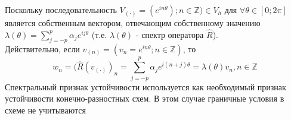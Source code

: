 \documentclass[__main__.tex]{subfiles}
\begin{document}
Поскольку последовательность $V_{(\cdot)} = (e^{in\theta}); n \in \mathbb{Z}) \in V_h$ для $\forall \theta \in [0;2\pi]$ \\
является собственным вектором, отвечающим собственному значению $\lambda(\theta) = \sum_{j=-p}^{p}\alpha_je^{ij\theta}$ (т.е. $\lambda(\theta)$ 
- спектр оператора $\hat{R}$).\\
Действительно, если $v_{(n)} = (v_n = e^{in\theta};n \in \mathbb{Z})$, то \\
$$w_n = (\hat{R}(v_{(\cdot)})_n = \sum_{j=-p}^{p}\alpha_je^{i(n+j)\theta}=\lambda(\theta)v_n, n \in \mathbb{Z}$$
Спектральный признак устойчивости используется как необходимый признак устойчивости конечно-разностных схем. В этом случае граничные условия в схеме не учитываются
\end{document}
